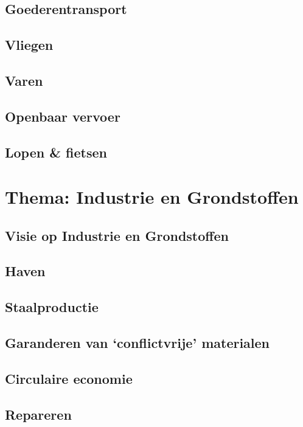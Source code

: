 \section{Goederentransport}
\section{Vliegen}
\section{Varen}
\section{Openbaar vervoer}
\section{Lopen \& fietsen}

\chapter{Thema: Industrie en Grondstoffen}
\section{Visie op Industrie en Grondstoffen}
\section{Haven}
\section{Staalproductie}
\section{Garanderen van `conflictvrije' materialen}
\section{Circulaire economie}
\section{Repareren}


